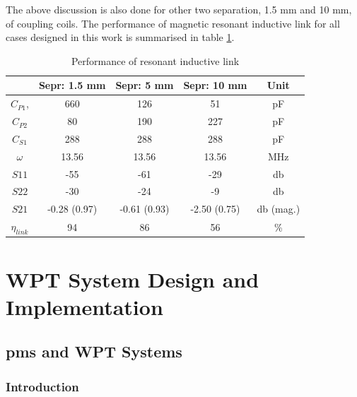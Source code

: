 \documentclass[12pt,a4paper,UKenglish]{report}
\begin{document}
The above discussion is also done for other two separation, 1.5 mm and 10 mm, of coupling coils. The performance of magnetic resonant inductive link for all cases designed in this work is summarised in table \ref{tab:ant_spec}. 

\begin{table}[H]
\caption{Performance of resonant inductive link} 
\begin{center}
\begin{tabular}{c|c|c|c|c}
\hline \hline
 								& \textbf{Sepr: 1.5 mm}	& \textbf{Sepr: 5 mm} 	& \textbf{Sepr: 10 mm}	& \textbf{Unit}		\\ \hline \hline
$C_{P1}$, 						& 660				& 126				& 51					& \si{\pico\farad}	\\ \hline
$C_{P2}$ 					 		& 80					& 190				& 227				& \si{\pico\farad}	\\ \hline
$C_{S1}$ 							& 288				&  288				& 288				& \si{\pico\farad}	\\ \hline
$\omega$							& 13.56				& 13.56				& 13.56				& \si{\mega\hertz}	\\ \hline
$S11$							& -55				& -61				& -29			  	& \si{\decibel}		\\ \hline
$S22$							& -30				& -24				& -9					& \si{\decibel} 		\\ \hline
$S21$							& -0.28 (0.97)			& -0.61 (0.93)			& -2.50 (0.75)			& \si{\decibel} (mag.)	\\ \hline
$\eta_{link}$						& 94					& 86					& 56					& \% \\		
\hline \hline
\end{tabular}
\end{center}
\label{tab:ant_spec}
\end{table}%

\clearpage
\newpage


\part{WPT System Design and Implementation} 
\chapter{\acrshort{pms} and WPT Systems}  
\section{Introduction}	%
\end{document}
